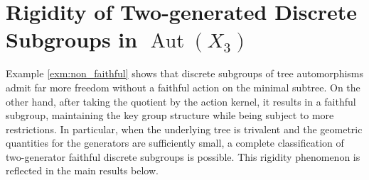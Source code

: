 \documentclass[12pt,leqno]{amsart}
\newcommand{\2}{L^2_{\rm per}(0, T)}
\newcommand{\aut}{{\operatorname{Aut}}}
\numberwithin{equation}{section}
\numberwithin{figure}{section}
\begin{document}
\section{Rigidity of Two-generated Discrete Subgroups in \texorpdfstring{$\aut(X_3)$}{Aut(X3)}}\label{sec:rigidity}
Example \ref{exm:non_faithful} shows that discrete subgroups of tree automorphisms admit far more freedom without a faithful action on the minimal subtree. On the other hand, after taking the quotient by the action kernel, it results in a faithful subgroup, maintaining the key group structure while being subject to more restrictions. In particular, when the underlying tree is trivalent and the geometric quantities for the generators are sufficiently small, a complete classification of two-generator faithful discrete subgroups is possible. This rigidity phenomenon is reflected in the main results below.
\end{document}
